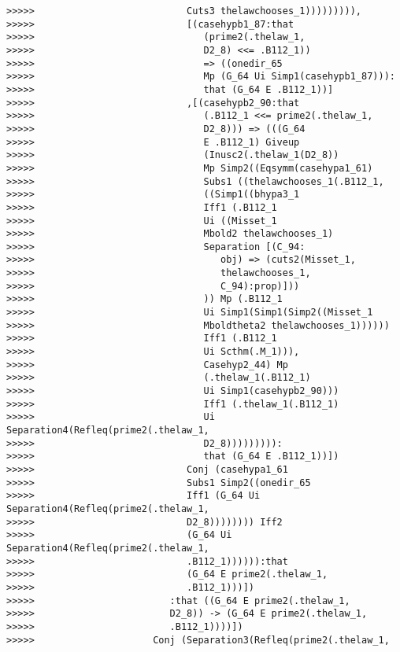 \documentclass[12pt]{article}
\begin{document}
\begin{verbatim}
>>>>>                           Cuts3 thelawchooses_1))))))))),
>>>>>                           [(casehypb1_87:that
>>>>>                              (prime2(.thelaw_1,
>>>>>                              D2_8) <<= .B112_1))
>>>>>                              => ((onedir_65
>>>>>                              Mp (G_64 Ui Simp1(casehypb1_87))):
>>>>>                              that (G_64 E .B112_1))]
>>>>>                           ,[(casehypb2_90:that
>>>>>                              (.B112_1 <<= prime2(.thelaw_1,
>>>>>                              D2_8))) => (((G_64
>>>>>                              E .B112_1) Giveup
>>>>>                              (Inusc2(.thelaw_1(D2_8))
>>>>>                              Mp Simp2((Eqsymm(casehypa1_61)
>>>>>                              Subs1 ((thelawchooses_1(.B112_1,
>>>>>                              ((Simp1((bhypa3_1
>>>>>                              Iff1 (.B112_1
>>>>>                              Ui ((Misset_1
>>>>>                              Mbold2 thelawchooses_1)
>>>>>                              Separation [(C_94:
>>>>>                                 obj) => (cuts2(Misset_1,
>>>>>                                 thelawchooses_1,
>>>>>                                 C_94):prop)]))
>>>>>                              )) Mp (.B112_1
>>>>>                              Ui Simp1(Simp1(Simp2((Misset_1
>>>>>                              Mboldtheta2 thelawchooses_1))))))
>>>>>                              Iff1 (.B112_1
>>>>>                              Ui Scthm(.M_1))),
>>>>>                              Casehyp2_44) Mp
>>>>>                              (.thelaw_1(.B112_1)
>>>>>                              Ui Simp1(casehypb2_90)))
>>>>>                              Iff1 (.thelaw_1(.B112_1)
>>>>>                              Ui Separation4(Refleq(prime2(.thelaw_1,
>>>>>                              D2_8))))))))):
>>>>>                              that (G_64 E .B112_1))])
>>>>>                           Conj (casehypa1_61
>>>>>                           Subs1 Simp2((onedir_65
>>>>>                           Iff1 (G_64 Ui Separation4(Refleq(prime2(.thelaw_1,
>>>>>                           D2_8)))))))) Iff2
>>>>>                           (G_64 Ui Separation4(Refleq(prime2(.thelaw_1,
>>>>>                           .B112_1)))))):that
>>>>>                           (G_64 E prime2(.thelaw_1,
>>>>>                           .B112_1)))])
>>>>>                        :that ((G_64 E prime2(.thelaw_1,
>>>>>                        D2_8)) -> (G_64 E prime2(.thelaw_1,
>>>>>                        .B112_1))))])
>>>>>                     Conj (Separation3(Refleq(prime2(.thelaw_1,

\end{verbatim}
\end{document}
